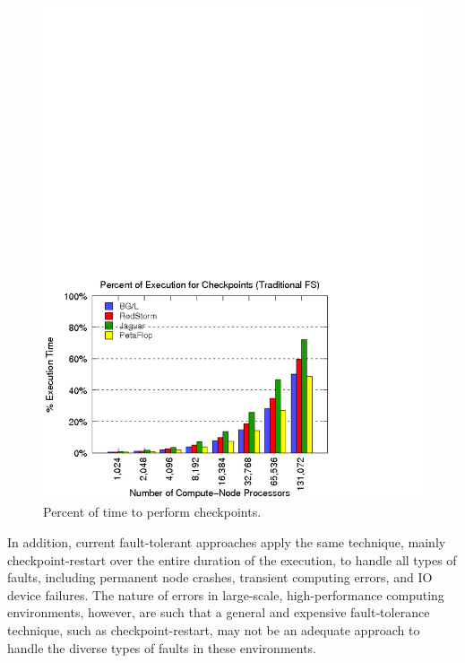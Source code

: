 \begin{figure}[!t]
\centering
\includegraphics[width=\columnwidth]{figures/sandia_percent_of_time_for_checkpoints.pdf}
\caption { Percent of time to perform checkpoints. }
\label{sandia_checkpoint_time}
\end{figure}

In addition, current fault-tolerant approaches apply the same technique, mainly checkpoint-restart over the entire duration of the execution, to handle all types of faults, including permanent node crashes, transient computing errors, and IO device failures. The nature of errors in large-scale, high-performance computing environments, however, are such that a general and expensive fault-tolerance technique, such as checkpoint-restart, may not be an adequate approach to handle the diverse types of faults in these environments. 

